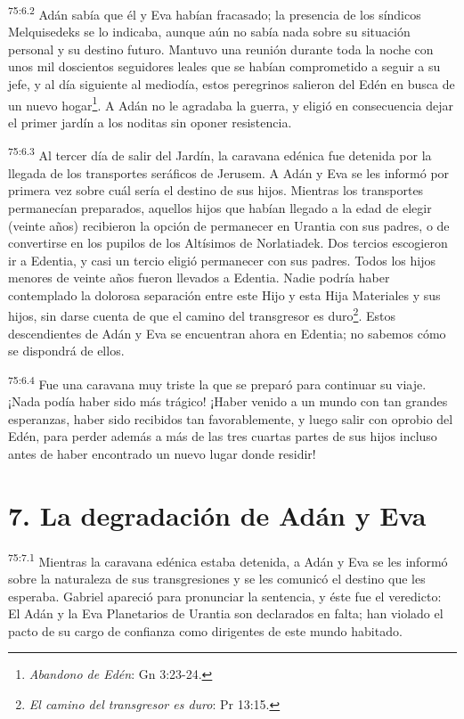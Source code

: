 \par
\textsuperscript{75:6.2} Adán sabía que él y Eva habían fracasado; la presencia de los síndicos Melquisedeks se lo indicaba, aunque aún no sabía nada sobre su situación personal y su destino futuro. Mantuvo una reunión durante toda la noche con unos mil doscientos seguidores leales que se habían comprometido a seguir a su jefe, y al día siguiente al mediodía, estos peregrinos salieron del Edén en busca de un nuevo hogar\footnote{\textit{Abandono de Edén}: Gn 3:23-24.}. A Adán no le agradaba la guerra, y eligió en consecuencia dejar el primer jardín a los noditas sin oponer resistencia.

\par
\textsuperscript{75:6.3} Al tercer día de salir del Jardín, la caravana edénica fue detenida por la llegada de los transportes seráficos de Jerusem. A Adán y Eva se les informó por primera vez sobre cuál sería el destino de sus hijos. Mientras los transportes permanecían preparados, aquellos hijos que habían llegado a la edad de elegir (veinte años) recibieron la opción de permanecer en Urantia con sus padres, o de convertirse en los pupilos de los Altísimos de Norlatiadek. Dos tercios escogieron ir a Edentia, y casi un tercio eligió permanecer con sus padres. Todos los hijos menores de veinte años fueron llevados a Edentia. Nadie podría haber contemplado la dolorosa separación entre este Hijo y esta Hija Materiales y sus hijos, sin darse cuenta de que el camino del transgresor es duro\footnote{\textit{El camino del transgresor es duro}: Pr 13:15.}. Estos descendientes de Adán y Eva se encuentran ahora en Edentia; no sabemos cómo se dispondrá de ellos.

\par
\textsuperscript{75:6.4} Fue una caravana muy triste la que se preparó para continuar su viaje. ¡Nada podía haber sido más trágico! ¡Haber venido a un mundo con tan grandes esperanzas, haber sido recibidos tan favorablemente, y luego salir con oprobio del Edén, para perder además a más de las tres cuartas partes de sus hijos incluso antes de haber encontrado un nuevo lugar donde residir!

\section*{7. La degradación de Adán y Eva}
\par
\textsuperscript{75:7.1} Mientras la caravana edénica estaba detenida, a Adán y Eva se les informó sobre la naturaleza de sus transgresiones y se les comunicó el destino que les esperaba. Gabriel apareció para pronunciar la sentencia, y éste fue el veredicto: El Adán y la Eva Planetarios de Urantia son declarados en falta; han violado el pacto de su cargo de confianza como dirigentes de este mundo habitado.

